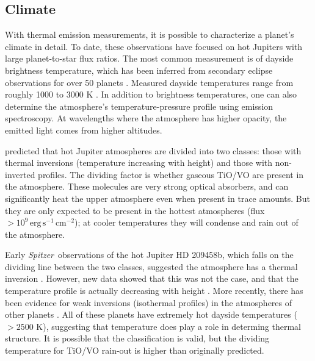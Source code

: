 \documentclass[graybox,natbib,nosecnum]{svmult}
\newcommand{\hbindex}[1]{\hl{#1}\index{#1}}  %
\newcommand{\project}[1]{\textsl{#1}}
\newcommand{\Spitzer}{\project{Spitzer}}
\begin{document}
\subsection{Climate}
With thermal emission measurements, it is possible to characterize a planet's climate in detail.  To date, these observations have focused on hot Jupiters with large planet-to-star flux ratios. The most common measurement is of dayside brightness temperature, which has been inferred from secondary eclipse observations for over 50 planets \citep{schwartz15}. Measured dayside temperatures range from roughly 1000 to 3000 K \citep{stevenson14b, kammer15, morley17}.  In addition to brightness temperatures, one can also determine the atmosphere's temperature-pressure profile using emission spectroscopy. At wavelengths where the atmosphere has higher opacity, the emitted light comes from higher altitudes. 

\cite{fortney08} predicted that hot Jupiter atmospheres are divided into two classes: those with thermal inversions (temperature increasing with height) and those with non-inverted profiles. The dividing factor is whether gaseous TiO/VO are present in the atmosphere. These molecules are very strong optical absorbers, and can significantly heat the upper atmosphere even when present in trace amounts. But they are only expected to be present in the hottest atmospheres (flux $>10^9\,\mathrm{erg}\,\mathrm{s}^{-1}\,\mathrm{cm}^{-2}$); at cooler temperatures they will condense and rain out of the atmosphere.

Early \Spitzer\ observations of the hot Jupiter HD 209458b, which falls on the dividing line between the two classes, suggested the atmosphere has a thermal inversion \citep{knutson08}. 
However, new data showed that this was not the case, and that the temperature profile is actually decreasing with height \citep{diamond-lowe14, schwarz15, line16}.  More recently, there has been evidence for weak inversions (isothermal profiles) in the atmospheres of other planets \citep{stevenson14, haynes15}. All of these planets have extremely hot dayside temperatures ($> 2500$ K), suggesting that temperature does play a role in determing thermal structure. It is possible that the \cite{fortney08} classification is valid, but the dividing temperature for TiO/VO rain-out is higher than originally predicted.
\end{document}
